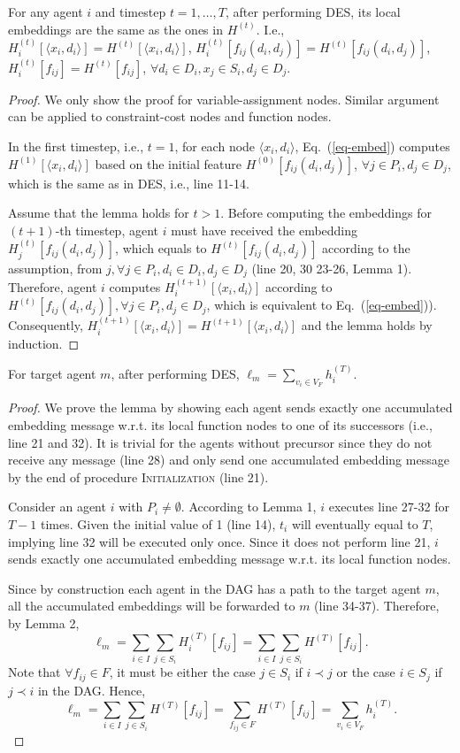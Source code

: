 \documentclass[letterpaper]{article} %
\begin{document}
\begin{lemma}
For any agent $i$ and timestep $t=1,\dots,T$, after performing DES, its local embeddings are the same as the ones in $H^{(t)}$. I.e., $H^{(t)}_i[\langle x_i,d_i\rangle]=H^{(t)}[\langle x_i,d_i\rangle]$, $H_i^{(t)}[f_{ij}(d_i,d_j)]=H^{(t)}[f_{ij}(d_i,d_j)]$, $H_i^{(t)}[f_{ij}]=H^{(t)}[f_{ij}]$, $\forall d_i\in D_i, x_j\in S_i, d_j\in D_j$.
\end{lemma}
\begin{proof}
We only show the proof for variable-assignment nodes. Similar argument can be applied to constraint-cost nodes and function nodes.

In the first timestep, i.e., $t=1$, for each node $\langle x_i,d_i\rangle$, Eq.~(\ref{eq-embed}) computes $H^{(1)}[\langle x_i,d_i\rangle]$ based on the initial feature $H^{(0)}[f_{ij}(d_i,d_j)]$, $\forall j\in P_i, d_j\in D_j$, which is the same as in DES, i.e., line 11-14.
 
Assume that the lemma holds for $t>1$. Before computing the embeddings for $(t+1)$-th timestep, agent $i$ must have received the embedding $H_j^{(t)}[f_{ij}(d_i,d_j)]$, which equals to $H^{(t)}[f_{ij}(d_i,d_j)]$ according to the assumption, from $j, \forall j\in P_i, d_i\in D_i,d_j\in D_j$ (line 20, 30 23-26, Lemma 1). Therefore, agent $i$ computes $H_i^{(t+1)}[\langle x_i,d_i\rangle]$ according to $H^{(t)}[f_{ij}(d_i,d_j)],\forall j\in P_i, d_j\in D_j$, which is equivalent to Eq.~(\ref{eq-embed})). Consequently, $H_i^{(t+1)}[\langle x_i,d_i\rangle]=H^{(t+1)}[\langle x_i,d_i\rangle]$ and the lemma holds by induction.
\end{proof}
\begin{lemma}
For target agent $m$, after performing DES, $\ell_m=\sum_{v_i\in V_F}h_i^{(T)}$.
\end{lemma}
\begin{proof}
We prove the lemma by showing each agent sends exactly one accumulated embedding message w.r.t. its local function nodes to one of its successors (i.e., line 21 and 32). It is trivial for the agents without precursor since they do not receive any message (line 28) and only send one accumulated embedding message by the end of procedure \textsc{Initialization} (line 21).

Consider an agent $i$ with $P_i\ne\emptyset$. According to Lemma 1, $i$ executes line 27-32 for $T-1$ times. Given the initial value of 1 (line 14), $t_i$ will eventually equal to $T$, implying line 32 will be executed only once. Since it does not perform line 21, $i$ sends exactly one accumulated embedding message w.r.t. its local function nodes.

Since by construction each agent in the DAG has a path to the target agent $m$, all the accumulated embeddings will be forwarded to $m$ (line 34-37). Therefore, by Lemma 2,
\[
\ell_m=\sum_{i\in I}\sum_{j\in S_i}H_i^{(T)}[f_{ij}]=\sum_{i\in I}\sum_{j\in S_i}H^{(T)}[f_{ij}].
\]
Note that $\forall f_{ij}\in F$, it must be either the case $j\in S_i$ if $i\prec j$ or the case $i\in S_j$ if $j\prec i$ in the DAG. Hence,
\[
\ell_m=\sum_{i\in I}\sum_{j\in S_i}H^{(T)}[f_{ij}]=\sum_{f_{ij}\in F}H^{(T)}[f_{ij}]=\sum_{v_i\in V_F}h_i^{(T)}.
\]
\end{proof}
\end{document}
